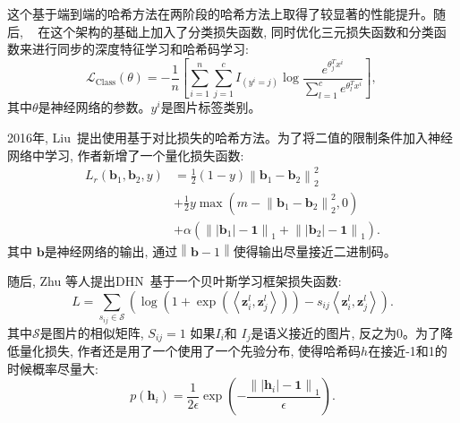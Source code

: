 这个基于端到端的哈希方法在两阶段的哈希方法上取得了较显著的性能提升。随后, ~\cite{yao2016deep} 在这个架构的基础上加入了分类损失函数, 同时优化三元损失函数和分类函数来进行同步的深度特征学习和哈希码学习:
\begin{equation}
    \mathcal{L}_{\text {Class}}(\theta)=-\frac{1}{n}\left[\sum_{i=1}^n \sum_{j=1}^c I_{\left(y^i=j\right)} \log \frac{e^{\theta_j^T x^i}}{\sum_{l=1}^c e^{\theta_l^T x^i}}\right] \text {, }
\end{equation}
其中$\theta$是神经网络的参数。$y^i$是图片标签类别。\par
2016年, Liu~\cite{liu2016deep}提出使用基于对比损失的哈希方法。为了将二值的限制条件加入神经网络中学习, 作者新增了一个量化损失函数:
\begin{equation}
    \begin{aligned}
        L_r\left(\mathbf{b}_1, \mathbf{b}_2, y\right) & =\frac{1}{2}(1-y)\left\|\mathbf{b}_1-\mathbf{b}_2\right\|_2^2 \\
        & +\frac{1}{2} y \max \left(m-\left\|\mathbf{b}_1-\mathbf{b}_2\right\|_2^2, 0\right) \\
        & +\alpha\left(\left\|\left|\mathbf{b}_1\right|-\mathbf{1}\right\|_1+\left\|\left|\mathbf{b}_2\right|-\mathbf{1}\right\|_1\right).
        \end{aligned}
\end{equation}
其中 $\mathbf{b}$是神经网络的输出, 通过$\left \| \mathbf{b} - 1 \right \|$使得输出尽量接近二进制码。\par
随后, Zhu 等人提出DHN~\cite{zhu2016deep}基于一个贝叶斯学习框架损失函数:
\begin{equation}
    L=\sum_{s_{i j} \in \mathcal{S}}\left(\log \left(1+\exp \left(\left\langle\boldsymbol{z}_i^l, \boldsymbol{z}_j^l\right\rangle\right)\right)-s_{i j}\left\langle\boldsymbol{z}_i^l, \boldsymbol{z}_j^l\right\rangle\right).
\end{equation}
其中$\mathcal{S}$是图片的相似矩阵, $S_{ij} = 1$ 如果$I_i$和 $I_j$是语义接近的图片, 反之为0。为了降低量化损失, 作者还是用了一个使用了一个先验分布, 使得哈希码$h$在接近-1和1的时候概率尽量大:
\begin{equation}
    p\left(\boldsymbol{h}_i\right)=\frac{1}{2 \epsilon} \exp \left(-\frac{\left\|\left|\boldsymbol{h}_i\right|-\mathbf{1}\right\|_1}{\epsilon}\right).
\end{equation}

